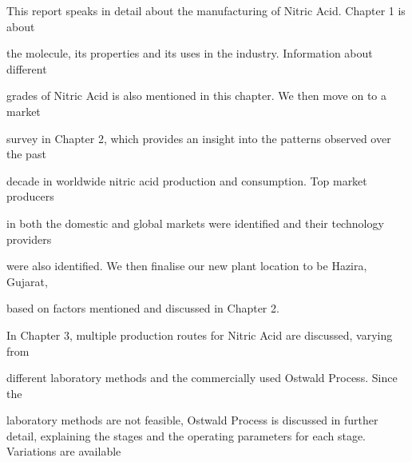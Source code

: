 \documentclass[a4paper,portrait,12pt]{article}
\begin{document}
\begin{flushleft}
This report speaks in detail about the manufacturing of Nitric Acid. Chapter 1 is about
\end{flushleft}


\begin{flushleft}
the molecule, its properties and its uses in the industry. Information about different
\end{flushleft}


\begin{flushleft}
grades of Nitric Acid is also mentioned in this chapter. We then move on to a market
\end{flushleft}


\begin{flushleft}
survey in Chapter 2, which provides an insight into the patterns observed over the past
\end{flushleft}


\begin{flushleft}
decade in worldwide nitric acid production and consumption. Top market producers
\end{flushleft}


\begin{flushleft}
in both the domestic and global markets were identified and their technology providers
\end{flushleft}


\begin{flushleft}
were also identified. We then finalise our new plant location to be Hazira, Gujarat,
\end{flushleft}


\begin{flushleft}
based on factors mentioned and discussed in Chapter 2.
\end{flushleft}





\begin{flushleft}
In Chapter 3, multiple production routes for Nitric Acid are discussed, varying from
\end{flushleft}


\begin{flushleft}
different laboratory methods and the commercially used Ostwald Process. Since the
\end{flushleft}


\begin{flushleft}
laboratory methods are not feasible, Ostwald Process is discussed in further detail, explaining the stages and the operating parameters for each stage. Variations are available
\end{flushleft}
\end{document}
